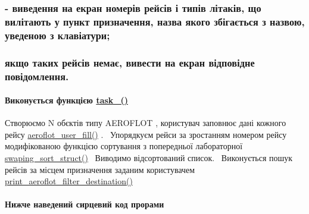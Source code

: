 \subsubsection*{-\/ виведення на екран номерів рейсів і типів літаків, що вилітають у пункт призначення, назва якого збігається з назвою, уведеною з клавіатури;}

\subsubsection*{якщо таких рейсів немає, вивести на екран відповідне повідомлення.}

\paragraph*{Виконується функцією \hyperlink{main_8c_a2e10594dc040249a898e2880b4c64322}{task\+\_()}}

Створюємо {\ttfamily N} об\textquotesingle{}єктів типу {\ttfamily A\+E\+R\+O\+F\+L\+OT} , користувач заповнює дані кожного рейсу \hyperlink{main_8c_a0e67aa1728da412b6d456dcd67400c28}{aeroflot\+\_\+user\+\_\+fill()} .~\newline
Упорядкуєм рейси за зростанням номером рейсу модифікованою функцією сортування з попередньої лабораторної \hyperlink{main_8c_ada53f29a40add605d28459936c17d8df}{swaping\+\_\+sort\+\_\+struct()}~\newline
 Виводимо відсортований список.~\newline
Виконується пошук рейсів за місцем призначення заданим користувачем \hyperlink{main_8c_aba85c797baee5c4f44cfb1bdf805889d}{print\+\_\+aeroflot\+\_\+filter\+\_\+destination()} \paragraph*{Нижче наведений сирцевий код прорами}


